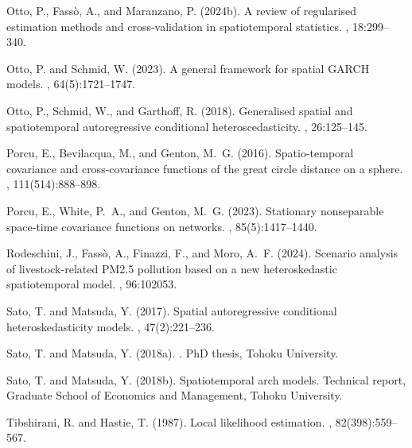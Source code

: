 \documentclass[fleqn,11pt]{article}
\begin{document}
\begin{thebibliography}{}
	Otto, P., Fass{\`o}, A., and Maranzano, P. (2024b).
	\newblock A review of regularised estimation methods and cross-validation in
	spatiotemporal statistics.
	, 18:299--340.
	
	Otto, P. and Schmid, W. (2023).
	\newblock A general framework for spatial {GARCH} models.
	, 64(5):1721--1747.
	
	Otto, P., Schmid, W., and Garthoff, R. (2018).
	\newblock Generalised spatial and spatiotemporal autoregressive conditional
	heteroscedasticity.
	, 26:125--145.
	
	Porcu, E., Bevilacqua, M., and Genton, M.~G. (2016).
	\newblock Spatio-temporal covariance and cross-covariance functions of the
	great circle distance on a sphere.
	,
	111(514):888--898.
	
	Porcu, E., White, P.~A., and Genton, M.~G. (2023).
	\newblock Stationary nonseparable space-time covariance functions on networks.
	, 85(5):1417--1440.
	
	Rodeschini, J., Fass{\`o}, A., Finazzi, F., and Moro, A.~F. (2024).
	\newblock Scenario analysis of livestock-related {PM2.5} pollution based on a
	new heteroskedastic spatiotemporal model.
	, 96:102053.
	
	Sato, T. and Matsuda, Y. (2017).
	\newblock Spatial autoregressive conditional heteroskedasticity models.
	, 47(2):221--236.
	
	Sato, T. and Matsuda, Y. (2018a).
	.
	\newblock PhD thesis, Tohoku University.
	
	Sato, T. and Matsuda, Y. (2018b).
	\newblock Spatiotemporal arch models.
	\newblock Technical report, Graduate School of Economics and Management, Tohoku
	University.
	
	Tibshirani, R. and Hastie, T. (1987).
	\newblock Local likelihood estimation.
	,
	82(398):559--567.
	
\end{thebibliography}
\end{document}
